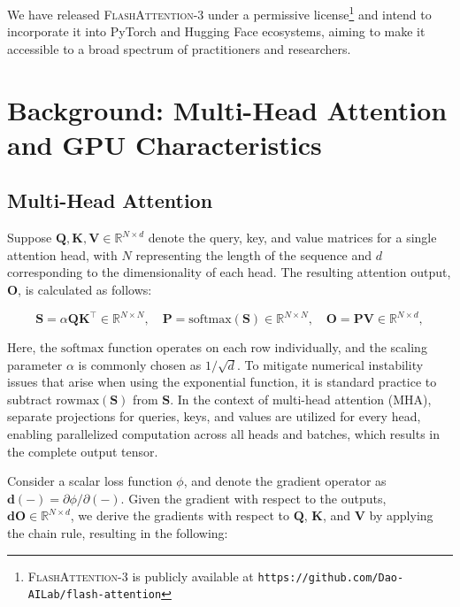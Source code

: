 We have released \textsc{FlashAttention-3} under a permissive license\footnote{\textsc{FlashAttention-3} is publicly available at \texttt{https://github.com/Dao-AILab/flash-attention}} and intend to incorporate it into PyTorch and Hugging Face ecosystems, aiming to make it accessible to a broad spectrum of practitioners and researchers.

\section{Background: Multi-Head Attention and GPU Characteristics}
\label{sec:background}

\subsection{Multi-Head Attention}
\label{subsec:multi_head_attn}

Suppose $\mathbf{Q}, \mathbf{K}, \mathbf{V} \in \mathbb{R}^{N \times d}$ denote the query, key, and value matrices for a single attention head, with $N$ representing the length of the sequence and $d$ corresponding to the dimensionality of each head. The resulting attention output, $\mathbf{O}$, is calculated as follows:

\begin{equation*}
  \mathbf{S} = \alpha \mathbf{Q} \mathbf{K}^\top \in \mathbb{R}^{N \times N}, \quad \mathbf{P} = \mathrm{softmax}(\mathbf{S}) \in \mathbb{R}^{N \times N}, \quad \mathbf{O} = \mathbf{P}\mathbf{V} \in \mathbb{R}^{N \times d},
\end{equation*}

Here, the $\mathrm{softmax}$ function operates on each row individually, and the scaling parameter $\alpha$ is commonly chosen as $1/\sqrt{d}$. To mitigate numerical instability issues that arise when using the exponential function, it is standard practice to subtract $\mathrm{rowmax}(\mathbf{S})$ from $\mathbf{S}$. In the context of multi-head attention (MHA), separate projections for queries, keys, and values are utilized for every head, enabling parallelized computation across all heads and batches, which results in the complete output tensor.

Consider a scalar loss function $\phi$, and denote the gradient operator as $\mathbf{d}(-) = \partial \phi / \partial (-)$. Given the gradient with respect to the outputs, $\mathbf{dO} \in \mathbb{R}^{N \times d}$, we derive the gradients with respect to $\mathbf{Q}$, $\mathbf{K}$, and $\mathbf{V}$ by applying the chain rule, resulting in the following:

